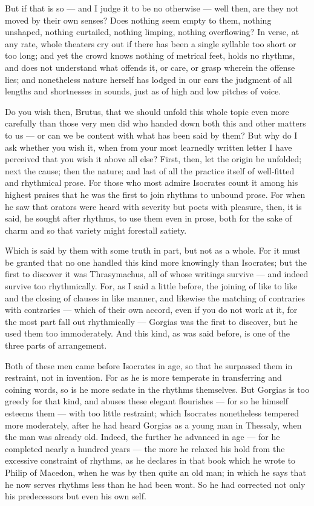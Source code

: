  But if that is so — and I judge it to be no otherwise — well then, are they not moved by their own senses? Does nothing seem empty to them, nothing unshaped, nothing curtailed, nothing limping, nothing overflowing? In verse, at any rate, whole theaters cry out if there has been a single syllable too short or too long; and yet the crowd knows nothing of metrical feet, holds no rhythms, and does not understand what offends it, or care, or grasp wherein the offense lies; and nonetheless nature herself has lodged in our ears the judgment of all lengths and shortnesses in sounds, just as of high and low pitches of voice.

 Do you wish then, Brutus, that we should unfold this whole topic even more carefully than those very men did who handed down both this and other matters to us — or can we be content with what has been said by them? But why do I ask whether you wish it, when from your most learnedly written letter I have perceived that you wish it above all else? First, then, let the origin be unfolded; next the cause; then the nature; and last of all the practice itself of well-fitted and rhythmical prose. For those who most admire Isocrates count it among his highest praises that he was the first to join rhythms to unbound prose. For when he saw that orators were heard with severity but poets with pleasure, then, it is said, he sought after rhythms, to use them even in prose, both for the sake of charm and so that variety might forestall satiety.

 Which is said by them with some truth in part, but not as a whole. For it must be granted that no one handled this kind more knowingly than Isocrates; but the first to discover it was Thrasymachus, all of whose writings survive — and indeed survive too rhythmically. For, as I said a little before, the joining of like to like and the closing of clauses in like manner, and likewise the matching of contraries with contraries — which of their own accord, even if you do not work at it, for the most part fall out rhythmically — Gorgias was the first to discover, but he used them too immoderately. And this kind, as was said before, is one of the three parts of arrangement.

 Both of these men came before Isocrates in age, so that he surpassed them in restraint, not in invention. For as he is more temperate in transferring and coining words, so is he more sedate in the rhythms themselves. But Gorgias is too greedy for that kind, and abuses these elegant flourishes — for so he himself esteems them — with too little restraint; which Isocrates nonetheless tempered more moderately, after he had heard Gorgias as a young man in Thessaly, when the man was already old. Indeed, the further he advanced in age — for he completed nearly a hundred years — the more he relaxed his hold from the excessive constraint of rhythms, as he declares in that book which he wrote to Philip of Macedon, when he was by then quite an old man; in which he says that he now serves rhythms less than he had been wont. So he had corrected not only his predecessors but even his own self.

